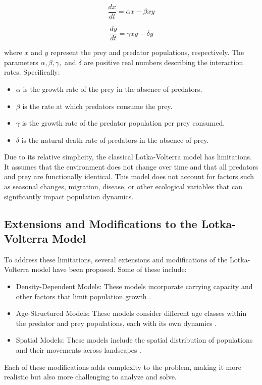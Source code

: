 \documentclass[twocolumn]{article}
\begin{document}
\[
\frac{dx}{dt} = \alpha x - \beta xy
\]

\[
\frac{dy}{dt} = \gamma xy - \delta y
\]

where \(x\) and \(y\) represent the prey and predator populations, respectively. The parameters \(\alpha, \beta, \gamma, \) and \(\delta\) are positive real numbers describing the interaction rates. Specifically:
\begin{itemize}
    \item \(\alpha\) is the growth rate of the prey in the absence of predators.
    \item \(\beta\) is the rate at which predators consume the prey.
    \item \(\gamma\) is the growth rate of the predator population per prey consumed.
    \item \(\delta\) is the natural death rate of predators in the absence of prey.
\end{itemize}

Due to its relative simplicity, the classical Lotka-Volterra model has limitations. It assumes that the environment does not change over time and that all predators and prey are functionally identical. This model does not account for factors such as seasonal changes, migration, disease, or other ecological variables that can significantly impact population dynamics.

\subsection{Extensions and Modifications to the Lotka-Volterra Model}
To address these limitations, several extensions and modifications of the Lotka-Volterra model have been proposed. Some of these include:

\begin{itemize}
    \item Density-Dependent Models: These models incorporate carrying capacity and other factors that limit population growth \cite{Shertzer2014}.
    \item Age-Structured Models: These models consider different age classes within the predator and prey populations, each with its own dynamics \cite{FIU_Lecture4}.
    \item Spatial Models: These models include the spatial distribution of populations and their movements across landscapes \cite{Dunning1995}.
\end{itemize}

Each of these modifications adds complexity to the problem, making it more realistic but also more challenging to analyze and solve.
\end{document}
